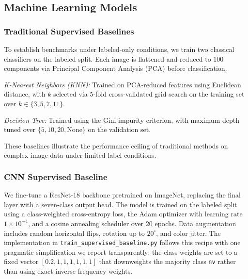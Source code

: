 \documentclass[conference]{IEEEtran}
\begin{document}
\subsection{Machine Learning Models}

\subsubsection{Traditional Supervised Baselines}
To establish benchmarks under labeled-only conditions, we train two
classical classifiers on the labeled split. Each image is flattened
and reduced to 100 components via Principal Component Analysis
(PCA) before classification.

\textit{K-Nearest Neighbors (KNN):} Trained on PCA-reduced features
using Euclidean distance, with $k$ selected via 5-fold cross-validated
grid search on the training set over $k \in \{3, 5, 7, 11\}$.

\textit{Decision Tree:} Trained using the Gini impurity criterion,
with maximum depth tuned over $\{5, 10, 20, \text{None}\}$ on the
validation set.

These baselines illustrate the performance ceiling of traditional
methods on complex image data under limited-label conditions.

\subsubsection{CNN Supervised Baseline}
We fine-tune a ResNet-18 backbone pretrained on ImageNet, replacing
the final layer with a seven-class output head. The model is
trained on the labeled split using a class-weighted cross-entropy
loss, the Adam optimizer with learning rate $1 \times 10^{-4}$,
and a cosine annealing scheduler over 20 epochs. Data augmentation
includes random horizontal flips, rotation up to $20^{\circ}$, and
color jitter. The implementation in
\texttt{train\_supervised\_baseline.py} follows this recipe with one
pragmatic simplification we report transparently: the class weights
are set to a fixed vector $[0.2, 1, 1, 1, 1, 1, 1]$ that downweights
the majority class \texttt{nv} rather than using exact
inverse-frequency weights.
\end{document}
